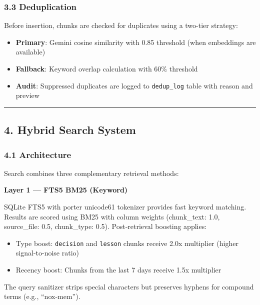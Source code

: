 \documentclass[
]{article}
\providecommand{\tightlist}{%
  \setlength{\itemsep}{0pt}\setlength{\parskip}{0pt}}
\begin{document}
\subsubsection{3.3 Deduplication}\label{deduplication}

Before insertion, chunks are checked for duplicates using a two-tier
strategy:

\begin{itemize}
\tightlist
\item
  \textbf{Primary}: Gemini cosine similarity with 0.85 threshold (when
  embeddings are available)
\item
  \textbf{Fallback}: Keyword overlap calculation with 60\% threshold
\item
  \textbf{Audit}: Suppressed duplicates are logged to
  \texttt{dedup\_log} table with reason and preview
\end{itemize}

\begin{center}\rule{0.5\linewidth}{0.5pt}\end{center}

\subsection{4. Hybrid Search System}\label{hybrid-search-system}

\subsubsection{4.1 Architecture}\label{architecture}

Search combines three complementary retrieval methods:

\textbf{Layer 1 --- FTS5 BM25 (Keyword)}

SQLite FTS5 with porter unicode61 tokenizer provides fast keyword
matching. Results are scored using BM25 with column weights
(chunk\_text: 1.0, source\_file: 0.5, chunk\_type: 0.5). Post-retrieval
boosting applies:

\begin{itemize}
\tightlist
\item
  Type boost: \texttt{decision} and \texttt{lesson} chunks receive 2.0x
  multiplier (higher signal-to-noise ratio)
\item
  Recency boost: Chunks from the last 7 days receive 1.5x multiplier
\end{itemize}

The query sanitizer strips special characters but preserves hyphens for
compound terms (e.g., ``nox-mem'').
\end{document}
